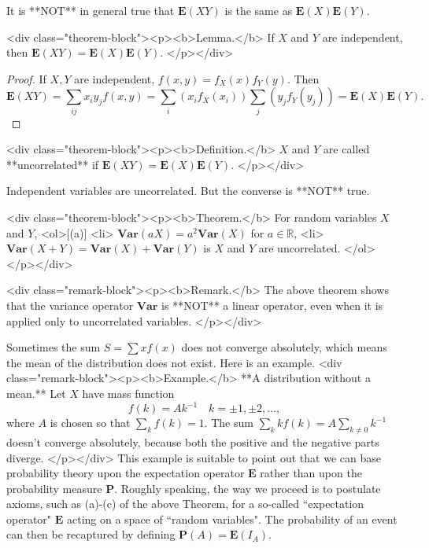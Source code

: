\begin{caution}
It is **NOT** in general true that $\mathbf{E}(XY)$ is the same as $\mathbf{E}(X)\mathbf{E}(Y)$. 
\end{caution}

<div class="theorem-block"><p><b>Lemma.</b> 
If $X$ and $Y$ are independent, then $\mathbf{E}(XY) = \mathbf{E}(X)\mathbf{E}(Y)$. 
</p></div>
\begin{proof}
If $X, Y$ are independent, $f(x,y) = f_X(x) f_Y(y)$. Then
$$\begin{equation}
    \mathbf{E}(XY) = \sum_{ij} x_i y_j f(x,y) = \sum_{i} \left( x_i f_X(x_i) \right) \sum_{j} \left( y_j f_Y(y_j) \right) = \mathbf{E}(X) \mathbf{E}(Y).
\end{equation}$$
\end{proof}

<div class="theorem-block"><p><b>Definition.</b> 
$X$ and $Y$ are called **uncorrelated** if $\mathbf{E}(XY) = \mathbf{E}(X)\mathbf{E}(Y)$.
</p></div>

\begin{caution}
Independent variables are uncorrelated. But the converse is **NOT** true.
\end{caution}

<div class="theorem-block"><p><b>Theorem.</b> 
For random variables $X$ and $Y$, 
<ol>[(a)]
    <li> $\mathbf{Var}(aX) = a^2 \mathbf{Var}(X)$ for $a \in \mathbb{R}$,
    <li> $\mathbf{Var}(X+Y) = \mathbf{Var}(X) + \mathbf{Var}(Y)$ is $X$ and $Y$ are uncorrelated.
</ol>
</p></div>

<div class="remark-block"><p><b>Remark.</b> 
The above theorem shows that the variance operator $\mathbf{Var}$ is **NOT** a linear operator, even when it 
is applied only to uncorrelated variables. 
</p></div>

Sometimes the sum $S = \sum xf(x)$ does not converge absolutely, which means the mean of the distribution does not exist. Here is an example. 
<div class="remark-block"><p><b>Example.</b> 
**A distribution without a mean.** Let $X$ have mass function 
$$\begin{equation}
    f(k) = Ak^{-1} \quad k = \pm 1, \pm 2, \dots,
\end{equation}$$
where $A$ is chosen so that $\sum_k f(k) = 1$. The sum $\sum_k kf(k) = A\sum_{k\neq 0} k^{-1}$ doesn't converge absolutely, because both the positive and the negative parts diverge. 
</p></div>
This example is suitable to point out that we can base probability theory upon the expectation operator $\mathbf{E}$ rather than upon the probability measure $\mathbf{P}$. Roughly speaking, the way we proceed is to postulate axioms, such as (a)-(c) of the above Theorem, for a so-called ``expectation operator" $\mathbf{E}$ acting on a space of ``random variables". The probability of an event can then be recaptured by defining $\mathbf{P}(A) = \mathbf{E}(I_A)$.  

